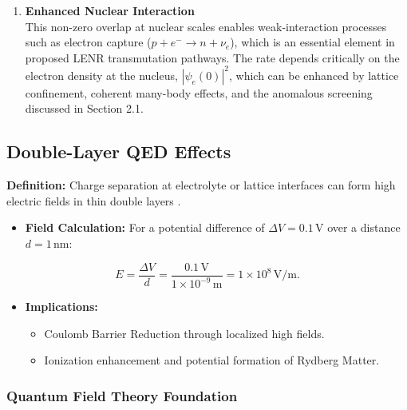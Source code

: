 \documentclass[11pt,a4paper]{article}
\begin{document}
\begin{enumerate}
  This large statistical ensemble is a key feature distinguishing condensed matter nuclear processes from few-body scattering experiments.
\item
  \textbf{Enhanced Nuclear Interaction}\\
  This non-zero overlap at nuclear scales enables weak-interaction processes such as electron capture ($p + e^- \to n + \nu_e$), which is an essential element in proposed LENR transmutation pathways. The rate depends critically on the electron density at the nucleus, $|\psi_e(0)|^2$, which can be enhanced by lattice confinement, coherent many-body effects, and the anomalous screening discussed in Section 2.1.
\end{enumerate}

\subsection{Double-Layer QED Effects}

\textbf{Definition:} Charge separation at electrolyte or lattice interfaces can form high electric fields in thin double layers \citep{preparata1995,delgiudice1985}.

\begin{itemize}
\item
  \textbf{Field Calculation:} For a potential difference of $\Delta V = 0.1\,\text{V}$ over a distance $d = 1\,\text{nm}$:
\end{itemize}

\begin{equation}
E = \frac{\Delta V}{d} = \frac{0.1\,\text{V}}{1\times 10^{-9}\,\text{m}} = 1\times 10^{8}\,\text{V/m}.
\end{equation}

\begin{itemize}
\item
  \textbf{Implications:}

  \begin{itemize}
    \item
    Coulomb Barrier Reduction through localized high fields.\\
  \item
    Ionization enhancement and potential formation of Rydberg Matter.
  \end{itemize}
\end{itemize}

\subsubsection{Quantum Field Theory Foundation}
\end{document}
